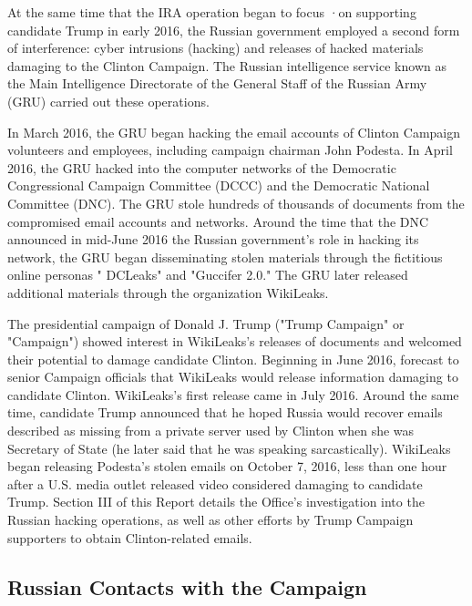 \documentclass{article}
\begin{document}
At the same time that the IRA operation began to focus ·on supporting candidate Trump in early 2016, the Russian government employed a  second form of interference: cyber intrusions (hacking) and releases of hacked materials damaging to the Clinton Campaign. The Russian intelligence service known as the Main Intelligence Directorate of the General Staff of the Russian Army (GRU) carried out these operations.

In March 2016, the GRU began hacking the email accounts of Clinton Campaign volunteers and employees, including campaign chairman John Podesta. In April 2016, the GRU hacked into the computer networks of the Democratic Congressional Campaign Committee (DCCC) and the Democratic National Committee (DNC). The GRU stole hundreds of thousands of documents from the compromised email accounts and networks. Around the time that the DNC announced in mid-June 2016 the Russian government's role in hacking its network, the GRU began disseminating stolen materials through the fictitious online personas " DCLeaks" and "Guccifer 2.0." The GRU later released additional materials through the organization WikiLeaks.

The presidential campaign of Donald J. Trump ("Trump Campaign" or "Campaign") showed interest in WikiLeaks's releases of documents and welcomed their potential to damage candidate Clinton.  Beginning in June 2016,  forecast to senior Campaign officials that WikiLeaks would release information damaging to candidate Clinton. WikiLeaks's first release came in July 2016. Around the same time, candidate Trump announced that he hoped Russia would recover emails described as missing from a private server used by Clinton when she was Secretary of State (he later said that he was speaking sarcastically). 
WikiLeaks began releasing Podesta's stolen emails on October 7, 2016, less than one hour after a U.S. media outlet released video considered damaging to candidate Trump. Section III of this Report details the Office's investigation into the Russian hacking operations, as well as other efforts by Trump Campaign supporters to obtain Clinton-related emails.

\subsection{Russian Contacts with the Campaign}
\end{document}
